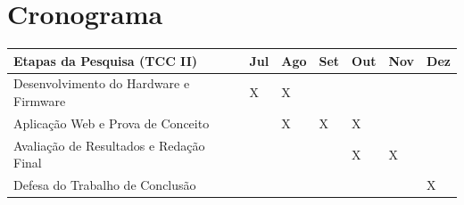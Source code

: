\chapter[Cronograma]{Cronograma}

\begin{table}[htb]
  \renewcommand{\arraystretch}{1.5}
  \ABNTEXfontereduzida
  \label{tab-cronograma}
  \begin{tabular}{p{6cm} p{1.2cm} p{1.2cm} p{1.2cm} p{1.2cm} p{1.2cm} p{1.2cm}}
    \hline
     \textbf{Etapas da Pesquisa (TCC II)} & \textbf{Jul} & \textbf{Ago} & \textbf{Set} & \textbf{Out} & \textbf{Nov} & \textbf{Dez} \\
    \hline
    Desenvolvimento do Hardware e Firmware & X & X &   &   &   &   \\ \hline
    Aplicação Web e Prova de Conceito &   &  X & X & X &   &   \\ \hline
    Avaliação de Resultados e Redação Final &   &   &   &  X & X &   \\ \hline
    Defesa do Trabalho de Conclusão &   &   &   &   &   & X \\ \hline
  \end{tabular}
\end{table}

